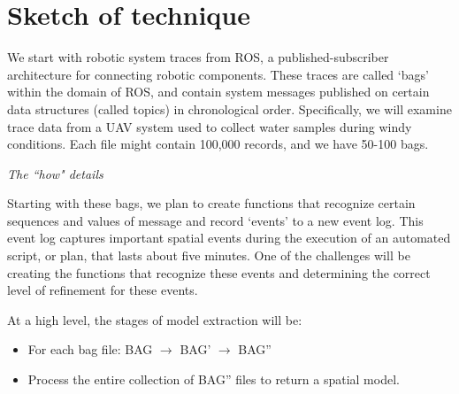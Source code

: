 \section{Sketch of technique}

We start with robotic system traces from ROS, a published-subscriber architecture for connecting robotic components.  
These traces are called `bags' within the domain of ROS, and contain system messages published on certain data structures (called topics) in chronological order.
Specifically, we will examine trace data from a UAV system used to collect water samples during windy conditions.
Each file might contain 100,000 records, and we have 50-100 bags.

\emph{The ``how" details}

Starting with these bags, we plan to create functions that recognize certain sequences and values of message and record `events' to a new event log.
This event log captures important spatial events during the execution of an automated script, or plan, that lasts about five minutes.
One of the challenges will be creating the functions that recognize these events and determining the correct level of refinement for these events.

At a high level, the stages of model extraction will be:

\begin{itemize}
  \item For each bag file: BAG $\rightarrow$ BAG' $\rightarrow$ BAG'' 

  \item Process the entire collection of BAG'' files to return a spatial model.
\end{itemize}


